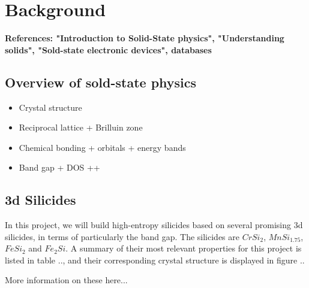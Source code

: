 \chapter{Background}
\label{sec:background}

\textbf{References: "Introduction to Solid-State physics", "Understanding solids", "Sold-state electronic devices", databases}

\section{Overview of sold-state physics}
\begin{itemize}
    \item Crystal structure
    \item Reciprocal lattice + Brilluin zone
    \item Chemical bonding + orbitals + energy bands
    \item Band gap + DOS ++
\end{itemize}

\section{3d Silicides}
In this project, we will build high-entropy silicides based on several promising 3d silicides, in terms of particularly the band gap. The silicides are $CrSi_2$, $MnSi_{1.75}$, $FeSi_2$ and $Fe_2Si$. A summary of their most relevant properties for this project is listed in table .., and their corresponding crystal structure is displayed in figure ..


More information on these here...